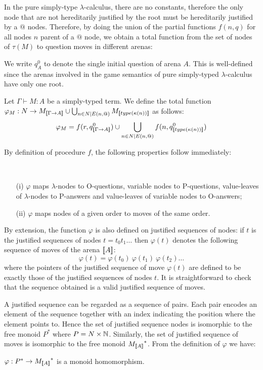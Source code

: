 In the pure simply-type $\lambda$-calculus, there are no constants, therefore the only node that are not hereditarily justified
by the root must be hereditarily justified by a $@$ nodes. Therefore, by doing the union of the partial functions $f(n,q)$
for all nodes $n$ parent of a $@$ node, we obtain a total function from the set of nodes of $\tau(M)$ to question moves in different arenas:

We write $q^0_A$ to denote the single initial question of arena $A$.
This is well-defined since the arenas involved in the game semantics
of pure simply-typed $\lambda$-calculus have only one root.


\begin{dfn}
Let $\Gamma \vdash M : A$ be a simply-typed term. We define the
total function $\varphi_M : N \rightarrow M_{[\![ \Gamma \rightarrow
A ]\!]} \cup \bigcup_{n \in N | E(n, @)} M_{{[\![ type(\kappa(n)) ]\!]}}$ as
follows:
$$\varphi_M = f(r, q^0_{{[\![ \Gamma \rightarrow A ]\!]}}) \cup \bigcup_{n \in N | E(n, @)}  f(n, q^0_{{[\![ type(\kappa(n)) ]\!]}} ) $$
\end{dfn}

By definition of procedure $f$, the following properties follow
immediately:
\begin{property} \
\label{proper:phi_conserve_order}
\begin{itemize}
\item[(i)] $\varphi$ maps $\lambda$-nodes to O-questions, variable nodes to
P-questions, value-leaves of $\lambda$-nodes to P-answers and
value-leaves of variable nodes to O-answers;
\item[(ii)] $\varphi$ maps nodes of a given order to moves of the same order.
\end{itemize}
\end{property}


By extension, the function $\varphi$ is also defined on justified
sequences of nodes: if $t$ is the justified sequences of nodes $t =
t_0 t_1 \ldots$ then $\varphi(t)$ denotes the following sequence of
moves of the arena ${[\![ A ]\!]}$:
$$\varphi(t) = \varphi(t_0)\ \varphi(t_1)\  \varphi(t_2) \ldots$$
where the pointers of the justified sequence of move $\varphi(t)$
are defined to be exactly those of the justified sequences of nodes
$t$. It is straightforward to check that the sequence obtained is a
valid justified sequence of moves.


A justified sequence can be regarded as a sequence of pairs. Each pair encodes an element of the sequence together
with an index indicating the position where the element points to. Hence the set of justified sequence nodes is isomorphic
to the free monoid $P^*$ where $P = N \times \mathbb{N}$. Similarly, the set of justified sequence of moves is isomorphic to
the free monoid ${M_{{[\![ A ]\!]}}}^*$. From the definition of $\varphi$ we have:
\begin{lem}
\label{lem:varphi_monoidhomom}
$\varphi : P^* \rightarrow {M_{{[\![A ]\!]}}}^*$ is a monoid homomorphism.
\end{lem}


